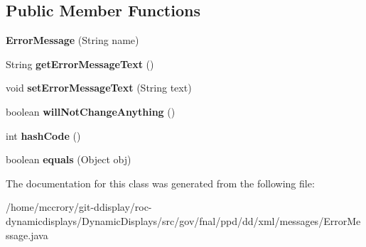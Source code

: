 \subsection*{Public Member Functions}
\begin{DoxyCompactItemize}
\item 
\hypertarget{classgov_1_1fnal_1_1ppd_1_1dd_1_1xml_1_1messages_1_1ErrorMessage_aafbd59ec35884901d3c530680489d075}{{\bfseries Error\-Message} (String name)}\label{classgov_1_1fnal_1_1ppd_1_1dd_1_1xml_1_1messages_1_1ErrorMessage_aafbd59ec35884901d3c530680489d075}

\item 
\hypertarget{classgov_1_1fnal_1_1ppd_1_1dd_1_1xml_1_1messages_1_1ErrorMessage_a75afa5bffa52d1dec9229c82062a0b6d}{String {\bfseries get\-Error\-Message\-Text} ()}\label{classgov_1_1fnal_1_1ppd_1_1dd_1_1xml_1_1messages_1_1ErrorMessage_a75afa5bffa52d1dec9229c82062a0b6d}

\item 
\hypertarget{classgov_1_1fnal_1_1ppd_1_1dd_1_1xml_1_1messages_1_1ErrorMessage_a269c7f1eaf795a7a6a3803ce567e8607}{void {\bfseries set\-Error\-Message\-Text} (String text)}\label{classgov_1_1fnal_1_1ppd_1_1dd_1_1xml_1_1messages_1_1ErrorMessage_a269c7f1eaf795a7a6a3803ce567e8607}

\item 
\hypertarget{classgov_1_1fnal_1_1ppd_1_1dd_1_1xml_1_1messages_1_1ErrorMessage_a730d05a055e96b98ef0e6723cd3d85a9}{boolean {\bfseries will\-Not\-Change\-Anything} ()}\label{classgov_1_1fnal_1_1ppd_1_1dd_1_1xml_1_1messages_1_1ErrorMessage_a730d05a055e96b98ef0e6723cd3d85a9}

\item 
\hypertarget{classgov_1_1fnal_1_1ppd_1_1dd_1_1xml_1_1messages_1_1ErrorMessage_a835f9f39c5379b96cc772d1cc6c39ecd}{int {\bfseries hash\-Code} ()}\label{classgov_1_1fnal_1_1ppd_1_1dd_1_1xml_1_1messages_1_1ErrorMessage_a835f9f39c5379b96cc772d1cc6c39ecd}

\item 
\hypertarget{classgov_1_1fnal_1_1ppd_1_1dd_1_1xml_1_1messages_1_1ErrorMessage_a1a3858d7b600d60db4f5d1d9e1941987}{boolean {\bfseries equals} (Object obj)}\label{classgov_1_1fnal_1_1ppd_1_1dd_1_1xml_1_1messages_1_1ErrorMessage_a1a3858d7b600d60db4f5d1d9e1941987}

\end{DoxyCompactItemize}


The documentation for this class was generated from the following file\-:\begin{DoxyCompactItemize}
\item 
/home/mccrory/git-\/ddisplay/roc-\/dynamicdisplays/\-Dynamic\-Displays/src/gov/fnal/ppd/dd/xml/messages/Error\-Message.\-java\end{DoxyCompactItemize}
